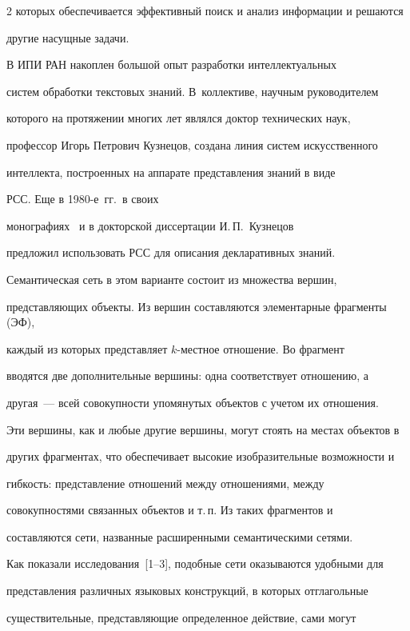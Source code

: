 \begin{multicols}{2}
которых обеспечивается эффективный поиск и анализ информации и решаются


другие насущные задачи.





 В ИПИ РАН накоплен большой опыт разработки интеллектуальных


систем обработки текстовых знаний. В~коллективе, научным руководителем


которого на протяжении многих лет являлся доктор технических наук,


профессор Игорь Петрович Кузнецов, создана линия систем искусственного


интеллекта, построенных на аппарате представления знаний в виде


РСС. Еще в 1980-е~гг.\ в своих


монографиях~\cite{ma-l1, ma-l2} и в докторской диссертации И.\,П.~Кузнецов


предложил использовать РСС для описания декларативных знаний.





 Семантическая сеть в этом варианте состоит из множества вершин,


представляющих объекты. Из вершин составляются элементарные фрагменты (ЭФ),


каждый из которых представляет $k$-мест\-ное отношение. Во фрагмент


вводятся две дополнительные вершины: одна соответствует отношению, а


другая~--- всей совокупности упомянутых объектов с учетом их отношения.


Эти вершины, как и любые другие вершины, могут стоять на местах объектов в


других фрагментах, что обеспечивает высокие изоб\-ра\-зи\-тель\-ные возможности и


гибкость: представление отношений между отношениями, между


совокупностями связанных объектов и т.\,п. Из таких фрагментов и


составляются сети, названные расширенными семантическими сетями.


Как показали исследования~[1--3], подобные сети оказываются удобными для


представления различных языковых конструкций, в которых отглагольные


существительные, представляющие определенное действие, сами могут



\end{multicols}
